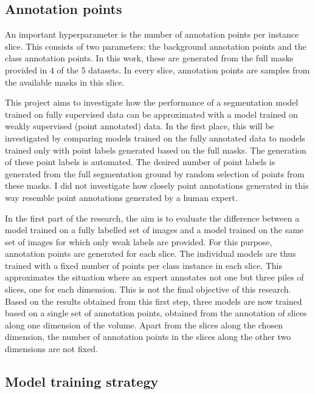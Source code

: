 \subsection{Annotation points\label{sec:annotationPoints}}
\par{
    An important hyperparameter is the number of annotation points per instance slice.
    This consists of two parameters: the background annotation points and the class annotation points.
    In this work, these are generated from the full masks provided in 4 of the 5 datasets.
    In every slice, annotation points are samples from the available masks in this slice.
}
\par{
    This project aims to investigate how the performance of a segmentation model trained on fully supervised data can be approximated with a model trained on weakly supervised (point annotated) data.
    In the first place, this will be investigated by comparing models trained on the fully annotated data to models trained only with point labels generated based on the full masks.
    The generation of these point labels is automated. 
    The desired number of point labels is generated from the full segmentation ground by random selection of points from these masks.
    I did not investigate how closely point annotations generated in this way resemble point annotations generated by a human expert.
}
\par{
    In the first part of the research, the aim is to evaluate the difference between a model trained on a fully labelled set of images and a model trained on the same set of images for which only weak labels are provided.
    For this purpose, annotation points are generated for each slice.
    The individual models are thus trained with a fixed number of points per class instance in each slice. 
    This approximates the situation where an expert annotates not one but three piles of slices, one for each dimension. This is not the final objective of this research.
    Based on the results obtained from this first step, three models are now trained based on a single set of annotation points, obtained from the annotation of slices along one dimension of the volume.
    Apart from the slices along the chosen dimension, the number of annotation points in the slices along the other two dimensions are not fixed.
}
\FloatBarrier
\subsection{Model training strategy}

